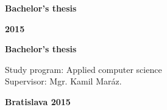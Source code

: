 \begin{center}
\centerline{\LARGE\sc\textbf\skola}
\sc\LARGE\textbf\fakulta
\end{center}

\vspace*{8cm}

\begin{center}
\begin{minipage}{0.8\textwidth}
\begin{center}
 \LARGE\sc\textbf\nazov
 \vspace{1em}
 \centerline{\Large\bf Bachelor's thesis}
\end{center}
\end{minipage}
\end{center}

\vfill
\noindent
 {\bf 2015}  \hfill {\bf \autor}
\thispagestyle{empty}



\newpage
\begin{center}
\centerline{\LARGE\sc\textbf\skola}
\sc\LARGE\textbf\fakulta
\end{center}

\vspace*{8cm}

\begin{center}
\begin{minipage}{0.8\textwidth}
\begin{center}
 \LARGE\sc\textbf\nazov 
\end{center}
\vspace{1em}
\centerline{\Large\bf Bachelor's thesis}
\end{minipage}
\end{center}

\vspace{5cm}

\linespread{1.3}%
\selectfont

\noindent
Study program: \hspace{0.8em} Applied computer science\\
Supervisor: \hspace{2.4em} Mgr. Kamil Maráz.


\vfill
\noindent
{\bf Bratislava 2015}  \hfill {\bf \autor}
\thispagestyle{empty}


